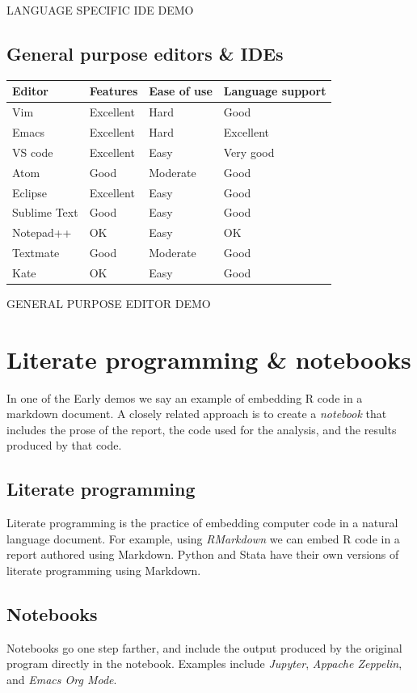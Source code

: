 \documentclass[]{book}
\begin{document}
LANGUAGE SPECIFIC IDE DEMO

\subsection{General purpose editors \&
IDEs}\label{general-purpose-editors-ides}

\begin{longtable}[]{@{}llll@{}}
\toprule
Editor & Features & Ease of use & Language support\tabularnewline
\midrule
\endhead
Vim & Excellent & Hard & Good\tabularnewline
Emacs & Excellent & Hard & Excellent\tabularnewline
VS code & Excellent & Easy & Very good\tabularnewline
Atom & Good & Moderate & Good\tabularnewline
Eclipse & Excellent & Easy & Good\tabularnewline
Sublime Text & Good & Easy & Good\tabularnewline
Notepad++ & OK & Easy & OK\tabularnewline
Textmate & Good & Moderate & Good\tabularnewline
Kate & OK & Easy & Good\tabularnewline
\bottomrule
\end{longtable}

GENERAL PURPOSE EDITOR DEMO

\section{Literate programming \&
notebooks}\label{literate-programming-notebooks}

In one of the Early demos we say an example of embedding R code in a
markdown document. A closely related approach is to create a
\emph{notebook} that includes the prose of the report, the code used for
the analysis, and the results produced by that code.

\subsection{Literate programming}\label{literate-programming}

Literate programming is the practice of embedding computer code in a
natural language document. For example, using \emph{RMarkdown} we can
embed R code in a report authored using Markdown. Python and Stata have
their own versions of literate programming using Markdown.

\subsection{Notebooks}\label{notebooks}

Notebooks go one step farther, and include the output produced by the
original program directly in the notebook. Examples include
\emph{Jupyter}, \emph{Appache Zeppelin}, and \emph{Emacs Org Mode}.
\end{document}
